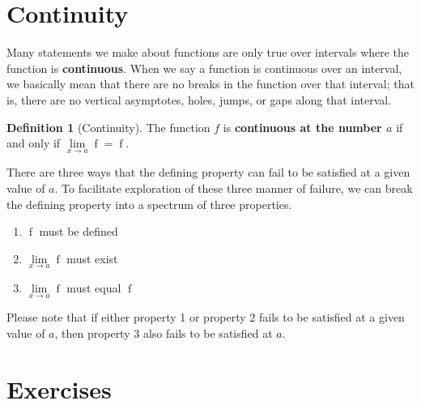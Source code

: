 \documentclass[12pt,]{book}
\newcommand{\terminology}[1]{\textbf{#1}}
\theoremstyle{plain}
\theoremstyle{definition}
\newtheorem{definition}[theorem]{Definition}
\numberwithin{equation}{section}
\newcommand{\fe}[2]{\mathop{{#1}{\left(#2\right)}}}
\begin{document}
\section[Continuity]{Continuity}\label{section-continuity}
Many statements we make about functions are only true over intervals where the function is \terminology{continuous}. When we say a function is continuous over an interval, we basically mean that there are no breaks in the function over that interval; that is, there are no vertical asymptotes, holes, jumps, or gaps along that interval.%
\begin{definition}[Continuity]\label{definition-continuity}
The function \(f\) is \terminology{continuous at the number \(a\)} if and only if \(\lim\limits_{x\to a}\fe{f}{x}=\fe{f}{a}\).%
\par
There are three ways that the defining property can fail to be satisfied at a given value of \(a\). To facilitate exploration of these three manner of failure, we can break the defining property into a spectrum of three properties.%
\begin{multicols}{3}
\begin{enumerate}
\item{}\(\fe{f}{a}\) must be defined\item{}\(\lim\limits_{x\to a}\fe{f}{x}\) must exist\item{}\(\lim\limits_{x\to a}\fe{f}{x}\) must equal \(\fe{f}{a}\)\end{enumerate}
\end{multicols}
\par
Please note that if either property 1 or property 2 fails to be satisfied at a given value of \(a\), then property 3 also fails to be satisfied at \(a\).%
\end{definition}
\typeout{************************************************}
\typeout{************************************************}
\section*{Exercises}\label{exercises-13}
\end{document}
